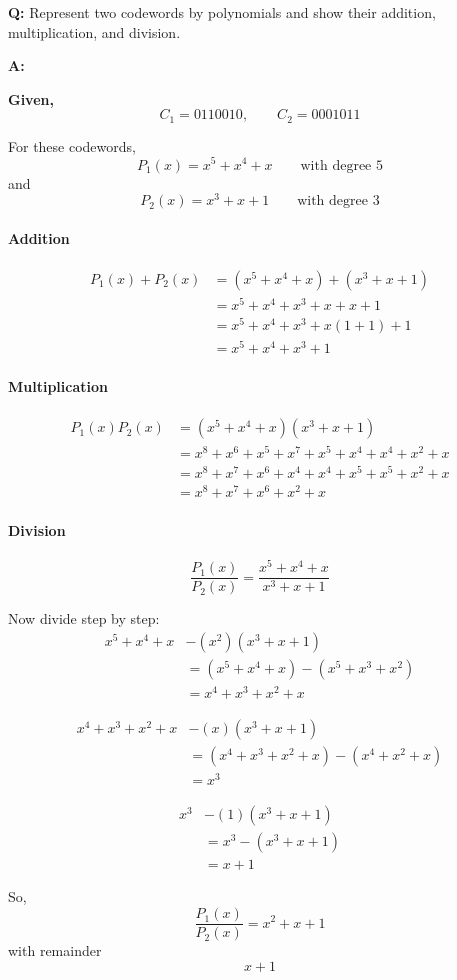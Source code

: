 \documentclass[11pt,a4paper]{book}
\newcounter{qna}[chapter]
\renewcommand{\theqna}{\thechapter.\arabic{qna}}
\newenvironment{questionanswerbox}[1][Example]{%
    \refstepcounter{qna}
    \begin{tcolorbox}[
        enhanced,
        breakable,
        colback=softlavender!10,
        colframe=softlavender!200,
        title={#1~\theqna},
        fonttitle=\bfseries,
        coltitle=white,
        colbacktitle=softlavender!200,
        sharp corners,
        boxrule=1pt,
        left=8pt,
        right=8pt,
        top=6pt,
        bottom=6pt
    ]
}{\end{tcolorbox}}
\begin{document}
\begin{questionanswerbox}[Polynomial Form of Codewords Example]
\textbf{Q:} Represent two codewords by polynomials and show their addition, multiplication, and division.

\textbf{A:}

\textbf{Given,}
\[
C_1=0110010,\qquad C_2=0001011
\]

For these codewords,
\[
P_1(x)=x^5+x^4+x
\qquad \text{with degree } 5
\]
and
\[
P_2(x)=x^3+x+1
\qquad \text{with degree } 3
\]

\paragraph{Addition}
\begin{align*}
P_1(x)+P_2(x)
&=(x^5+x^4+x)+(x^3+x+1)\\
&=x^5+x^4+x^3+x+x+1\\
&=x^5+x^4+x^3+x(1+1)+1\\
&=x^5+x^4+x^3+1
\end{align*}

\paragraph{Multiplication}
\begin{align*}
P_1(x)P_2(x)
&=(x^5+x^4+x)(x^3+x+1)\\
&=x^8+x^6+x^5+x^7+x^5+x^4+x^4+x^2+x\\
&=x^8+x^7+x^6+x^4+x^4+x^5+x^5+x^2+x\\
&=x^8+x^7+x^6+x^2+x
\end{align*}

\paragraph{Division}
\[
\frac{P_1(x)}{P_2(x)}=\frac{x^5+x^4+x}{x^3+x+1}
\]

Now divide step by step:
\begin{align*}
x^5+x^4+x
&-(x^2)(x^3+x+1)\\
&=(x^5+x^4+x)-(x^5+x^3+x^2)\\
&=x^4+x^3+x^2+x
\end{align*}

\begin{align*}
x^4+x^3+x^2+x
&-(x)(x^3+x+1)\\
&=(x^4+x^3+x^2+x)-(x^4+x^2+x)\\
&=x^3
\end{align*}

\begin{align*}
x^3
&-(1)(x^3+x+1)\\
&=x^3-(x^3+x+1)\\
&=x+1
\end{align*}

So,
\[
\frac{P_1(x)}{P_2(x)}=x^2+x+1
\]
with remainder
\[
x+1
\]
\end{questionanswerbox}
\end{document}
